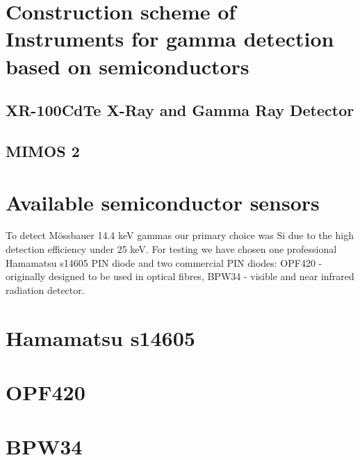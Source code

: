\section{Construction scheme of Instruments for gamma detection based on semiconductors}





\subsection{XR-100CdTe X-Ray and Gamma Ray Detector}

\subsection{MIMOS 2}


\section{Available semiconductor sensors}
To detect Mössbauer 14.4 keV gammas our primary choice was Si due to the high detection efficiency under 25 keV. For testing we have chosen one professional Hamamatsu s14605 PIN diode and two commercial PIN diodes: OPF420 - originally designed to be used in optical fibres, BPW34 - visible and near infrared radiation detector.  



\section{Hamamatsu s14605}

\section{OPF420}

\section{BPW34}


